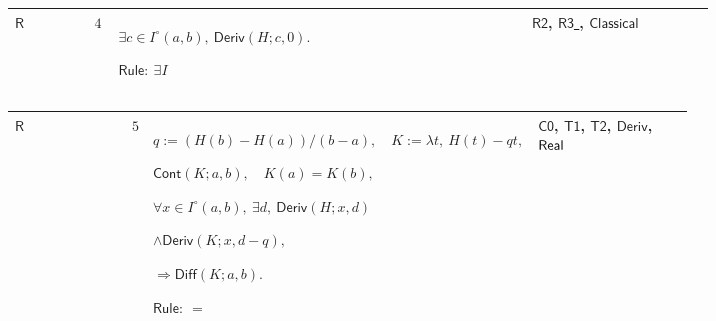\documentclass[12pt,reqno]{amsart}
\theoremstyle{blueplain}
\numberwithin{equation}{section}
\newlength{\FTCOneColumnBody}
\begin{document}
{\scriptsize \setlength{\parskip}{0pt}\nointerlineskip
\noindent 
\begin{tabular}{|@{}>{\centering\arraybackslash}m{0.10658\linewidth}|>{\centering\arraybackslash}m{0.03553\linewidth}|>{\centering\arraybackslash}m{0.52105\linewidth}|>{\centering\arraybackslash}m{0.23684\linewidth}|}
\hline
\hypertarget{proof:R4}{$\displaystyle \mathsf{R}$} & $\displaystyle 4$ & $%
\displaystyle \exists c\in I^\circ(a,b),\ \mathsf{Deriv}(H;c,0).$\par$%
\displaystyle \mathsf{Rule}:\ \exists I$ & \hyperlink{proof:R2}{$%
\displaystyle \mathsf{R2}$}, \hyperlink{proof:R3}{$\displaystyle \mathsf{R3}$%
}, \hyperlink{ax:Classical}{$\displaystyle \mathsf{Classical}$} \\ \hline
\end{tabular}%
}

{\scriptsize \setlength{\parskip}{0pt}\nointerlineskip
\noindent 
\begin{tabular}{|@{}>{\centering\arraybackslash}m{\FTCOneColumnBody}|}
\hline
$\displaystyle \mathsf{Context\_MVT}:=$\par$\displaystyle a<b,\quad\mathsf{%
Cont}(H;a,b),\quad\mathsf{Diff}(H;a,b).$ \\ \hline
\end{tabular}%
}

{\scriptsize \setlength{\parskip}{0pt}\nointerlineskip
\noindent 
\begin{tabular}{|@{}>{\centering\arraybackslash}m{0.10658\linewidth}|>{\centering\arraybackslash}m{0.03553\linewidth}|>{\centering\arraybackslash}m{0.52105\linewidth}|>{\centering\arraybackslash}m{0.23684\linewidth}|}
\hline
\hypertarget{proof:R5}{$\displaystyle \mathsf{R}$} & $\displaystyle 5$ & $%
\displaystyle q:=(H(b)-H(a))/(b-a),\quad K:=\lambda t,\ H(t)-qt,$\par$%
\displaystyle \mathsf{Cont}(K;a,b),\quad K(a)=K(b),$\par$\displaystyle %
\forall x\in I^\circ(a,b),\ \exists d,\ \mathsf{Deriv}(H;x,d)$\par$%
\displaystyle \land\mathsf{Deriv}(K;x,d-q),$\par$\displaystyle \Rightarrow%
\mathsf{Diff}(K;a,b).$\par$\displaystyle \mathsf{Rule}:\ =$ & \hyperlink{proof:C0}%
{$\displaystyle \mathsf{C0}$}, \hyperlink{proof:T1}{$\displaystyle \mathsf{T1%
}$}, \hyperlink{proof:T2}{$\displaystyle \mathsf{T2}$}, \hyperlink{def:Deriv}%
{$\displaystyle \mathsf{Deriv}$}, \hyperlink{ax:Real}{$\displaystyle \mathsf{%
Real}$} \\ \hline
\end{tabular}%
}
\end{document}
